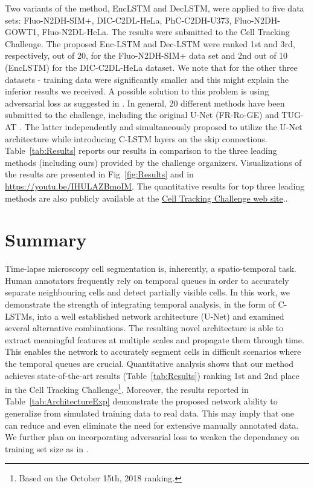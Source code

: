 \documentclass{article}
\begin{document}
Two variants of the method, EncLSTM and DecLSTM, were applied to five data sets: Fluo-N2DH-SIM+, DIC-C2DL-HeLa, PhC-C2DH-U373, Fluo-N2DH-GOWT1, Fluo-N2DL-HeLa. The results were submitted to the Cell Tracking Challenge. The proposed Enc-LSTM and Dec-LSTM were ranked 1st and 3rd, respectively, out of 20, for the Fluo-N2DH-SIM+ data set and 2nd out of 10 (EncLSTM) for the DIC-C2DL-HeLa dataset. We note that for the other three datasets - training data were significantly smaller and this might explain the inferior results we received. A possible solution to this problem is using adversarial loss as suggested in \cite{arbelle2017SAN}.
In general, 20 different methods have been submitted to the challenge, including the original U-Net (FR-Ro-GE) \cite{Ronneberger15} and TUG-AT \cite{Payer2018}. 
 The latter  independently and simultaneously proposed to utilize the U-Net architecture while introducing C-LSTM layers on the skip connections.   Table~\ref{tab:Results} reports our results in comparison to the three leading methods (including ours) provided by the challenge organizers. Visualizations of the results are presented in Fig~\ref{fig:Results} and in  \href{https://youtu.be/IHULAZBmoIM}{https://youtu.be/IHULAZBmoIM}. The quantitative results for top three leading methods are also publicly available at the \href{http://www.celltrackingchallenge.net/latest-ctb-results/}{Cell Tracking Challenge web site}..

\vspace{-0.175cm}
\section{Summary}\label{sec:Summary}

\vspace{-0.1cm}
Time-lapse microscopy cell segmentation is, inherently, a spatio-temporal task. Human annotators frequently rely on temporal queues in order to accurately separate neighbouring cells and detect partially visible cells. In this work, we demonstrate the strength of integrating temporal analysis, in the form of C-LSTMs, into a well established network architecture (U-Net) and examined several alternative combinations. The resulting novel architecture is able to extract meaningful features at multiple scales and propagate them through time. This enables the network to accurately segment cells in difficult scenarios where the temporal queues are crucial. Quantitative analysis shows that our method achieves state-of-the-art results (Table~\ref{tab:Results}) ranking 1st and 2nd place in the Cell Tracking Challenge\footnote{Based on the October 15th, 2018 ranking.}. Moreover, the results reported in Table~\ref{tab:ArchitectureExp}
demonstrate the proposed network ability 
to generalize from simulated training data 
to real data. This may imply that one can reduce and even eliminate the need for extensive manually annotated data. We further plan on incorporating adversarial loss to weaken the dependancy on training set size as in \cite{arbelle2017SAN}. 







\FloatBarrier



\end{document}
